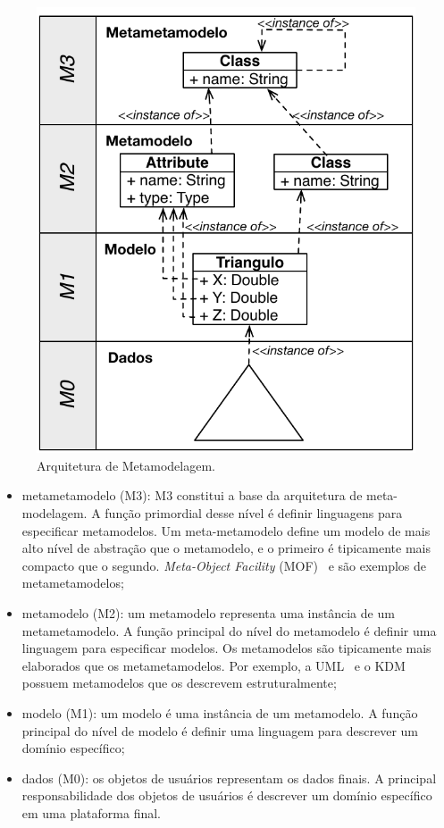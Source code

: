 \begin{figure}[htb]
 \caption{Arquitetura de Metamodelagem.}
 \label{fig:metamodelosCamadas}
 \centering
 \includegraphics[scale=0.9]{images/Arquitetura_de_metamodelagem}
 \fautor
\end{figure}

\begin{itemize}
	\item metametamodelo (M3): M3 constitui a base da arquitetura de meta-modelagem. A função primordial desse nível é definir linguagens para especificar metamodelos. Um meta-metamodelo define um modelo de mais alto nível de abstração que o metamodelo, e o primeiro é tipicamente mais compacto que o segundo. \textit{Meta-Object Facility} (MOF)~\cite{MOF} e \cite{EMF} são exemplos de metametamodelos;
	\item metamodelo (M2): um metamodelo representa uma instância de um metametamodelo. A função principal do nível do metamodelo é definir uma linguagem para especificar modelos. Os metamodelos são tipicamente mais elaborados que os metametamodelos. Por exemplo, a UML~\cite{UML:OMG} e o KDM~\cite{KDM:ISO} possuem metamodelos que os descrevem estruturalmente;
	\item modelo (M1): um modelo é uma instância de um metamodelo. A função principal do nível de modelo é definir uma linguagem para descrever um domínio específico;
	\item dados (M0): os objetos de usuários representam os dados finais. A principal responsabilidade dos objetos de usuários é descrever um domínio específico em uma plataforma final.
\end{itemize}

